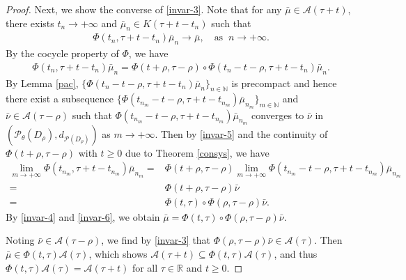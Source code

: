 \documentclass[11pt]{article}
\numberwithin{equation}{section}
\theoremstyle{plain}
\begin{document}
\begin{proof}
  
  Next, we show the converse of \eqref{invar-3}.
 Note that for any $\bar{\mu} \in \mathcal{A}(\tau+t)$,
 there exists $t_n \to +\infty$ and $\bar{\mu}_n \in K(\tau + t - t_n)$ such that
 \begin{align}\label{invar-4}
       \Phi(t_n , \tau + t - t_n) \bar{\mu}_n \rightarrow \bar{\mu},
       \quad \text{as } \ n \to +\infty.
 \end{align}
  By the cocycle property of $\Phi$, we have
 \begin{align}\label{invar-5}
       \Phi(t_n , \tau + t - t_n) \bar{\mu}_n 
       = \Phi(t+\rho, \tau-\rho) \circ  \Phi(t_n - t - \rho , \tau + t - t_n) \bar{\mu}_n.
 \end{align}
   By Lemma \ref{pac},  
  $\{ \Phi(t_n - t -\rho, \tau + t - t_n) \bar{\mu}_n \}_{n \in \mathbb{N} }$ is precompact
  and hence
   there exist a subsequence  $\{ \Phi(t_{n_m} - t - \rho , \tau + t - t_{n_m}) \bar{\mu}_{n_m} \}_{m \in \mathbb{N} }$ and $\bar{\nu} \in \mathcal{A}(\tau - \rho)$ such that
  $\Phi(t_{n_m} - t - \rho , \tau + t - t_{n_m}) \bar{\mu}_{n_m}$ converges to $\bar{\nu}$ in $(\mathcal{P}_{\theta}(D_{\rho}), d_{\mathcal{P}(D_{\rho} ) } )$ as $m \to +\infty$.
  Then by \eqref{invar-5} and the continuity of $\Phi(t+\rho, \tau-\rho)$
  with $t\ge 0$  due to Theorem \ref{consys}, we have
 \begin{align}\label{invar-6}
       \lim_{m \to +\infty} \Phi(t_{n_m}, \tau + t - t_{n_m}) \bar{\mu}_{n_m}
       = & \Phi(t+\rho, \tau-\rho) 
                \lim_{m \to +\infty} 
                     \Phi(t_{n_m} - t - \rho , \tau + t - t_{n_m}) \bar{\mu}_{n_m}  \nonumber\\
       = & \Phi(t+\rho, \tau-\rho) \bar{\nu}  \nonumber\\
       = & \Phi(t, \tau) \circ \Phi(\rho, \tau - \rho) \bar{\nu}.                   
 \end{align}  
 By \eqref{invar-4} and \eqref{invar-6}, we obtain 
 $\bar{\mu} = \Phi(t, \tau) \circ \Phi(\rho, \tau - \rho) \bar{\nu}$.
 
 Noting $\bar{\nu} \in \mathcal{A}(\tau - \rho)$,  
 we find by \eqref{invar-3} that 
       $\Phi(\rho, \tau - \rho) \bar{\nu} \in \mathcal{A}(\tau)$.
 Then $\bar{\mu} \in \Phi(t, \tau) \mathcal{A}(\tau)$,
 which shows $\mathcal{A}(\tau+t) \subseteq \Phi(t, \tau) \mathcal{A}(\tau)$, and thus
  $\Phi(t, \tau) \mathcal{A}(\tau) = \mathcal{A}(\tau+t)$ for all $\tau \in \mathbb{R}$ and $t \ge 0$.
 \end{proof}
\end{document}
